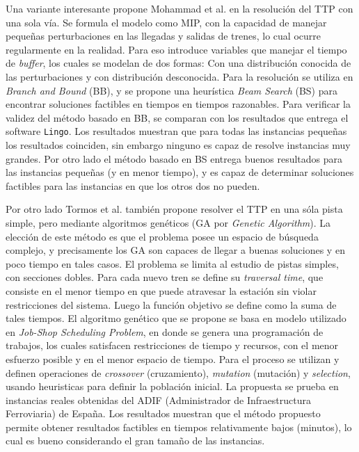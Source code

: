 \documentclass[letter, 10pt]{article}
\begin{document}
\begin{description}
	Una variante interesante propone Mohammad et al. \cite{Mohammad} en la resolución del TTP con una sola vía. Se formula el modelo como MIP, con la capacidad de manejar pequeñas perturbaciones en las llegadas y salidas de trenes, lo cual ocurre regularmente en la realidad. Para eso introduce variables que manejar el tiempo de \textit{buffer}, los cuales se modelan de dos formas: Con una distribución conocida de las perturbaciones y con distribución desconocida. Para la resolución se utiliza en \textit{Branch and Bound} (BB), y se propone una heurística \textit{Beam Search} (BS) para encontrar soluciones factibles en tiempos en tiempos razonables. Para verificar la validez del método basado en BB, se comparan con los resultados que entrega el software \texttt{Lingo}. Los resultados muestran que para todas las instancias pequeñas los resultados coinciden, sin embargo ninguno es capaz de resolve instancias muy grandes. Por otro lado el método basado en BS entrega buenos resultados para las instancias pequeñas (y en menor tiempo), y es capaz de determinar soluciones factibles para las instancias en que los otros dos no pueden.  


	Por otro lado Tormos et al. \cite{Genetic} también propone resolver el TTP en una sóla pista simple, pero mediante algoritmos genéticos (GA por \textit{Genetic Algorithm}). La elección de este método es que el problema posee un espacio de búsqueda complejo, y precisamente los GA son capaces de llegar a buenas soluciones y en poco tiempo en tales casos. El problema se limita al estudio de pistas simples, con secciones dobles. Para cada nuevo tren se define su \textit{traversal time}, que consiste en el menor tiempo en que puede atravesar la estación sin violar restricciones del sistema. Luego la función objetivo se define como la suma de tales tiempos. El algoritmo genético que se propone se basa en modelo utilizado en \textit{Job-Shop Scheduling Problem}, en donde se genera una programación de trabajos, los cuales satisfacen restricciones de tiempo y recursos, con el menor esfuerzo posible y en el menor espacio de tiempo. Para el proceso se utilizan y definen operaciones de \textit{crossover} (cruzamiento), \textit{mutation} (mutación) y \textit{selection}, usando heuristicas para definir la población inicial. La propuesta se prueba en instancias reales obtenidas del ADIF (Administrador de Infraestructura Ferroviaria) de España. Los resultados muestran que el método propuesto permite obtener resultados factibles en tiempos relativamente bajos (minutos), lo cual es bueno considerando el gran tamaño de las instancias. 


\end{description}
\end{document}
